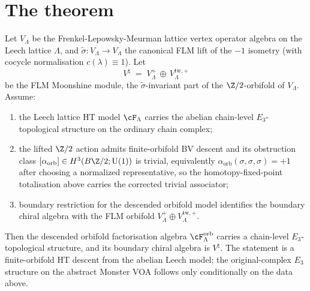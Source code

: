 \section{The theorem}
\label{sec:monster-chain-level-e3-top-statement}

\begin{theorem}
\label{thm:monster-chain-level-e3-top}
Let $V_\Lambda$ be the Frenkel-Lepowsky-Meurman lattice vertex
operator algebra on the Leech lattice $\Lambda$, and
$\widetilde{\sigma}\colon V_\Lambda \to V_\Lambda$ the canonical FLM
lift of the $-1$ isometry (with cocycle normalisation
$c(\lambda) \equiv 1$). Let
\[
 V^\natural
 \;=\; V_\Lambda^+
 \,\oplus\, V_\Lambda^{\mathrm{tw},+}
\]
be the FLM Moonshine module, the $\widetilde{\sigma}$-invariant part
of the $\Z/2$-orbifold of $V_\Lambda$. Assume:
\begin{enumerate}[label=\textup{(\roman*)}]
\item the Leech lattice HT model $\cF_\Lambda$ carries the abelian
chain-level $E_3$-topological structure on the ordinary chain complex;
\item the lifted $\Z/2$ action admits finite-orbifold BV descent and
its obstruction class
$[\alpha_{\mathrm{orb}}]\in H^3(B\Z/2;\mathrm{U}(1))$ is trivial,
equivalently
$\alpha_{\mathrm{orb}}(\sigma,\sigma,\sigma)=+1$ after choosing a
normalized representative, so the homotopy-fixed-point totalisation
above carries the corrected trivial associator;
\item boundary restriction for the descended orbifold model identifies
the boundary chiral algebra with the FLM orbifold
$V_\Lambda^+\oplus V_\Lambda^{\mathrm{tw},+}$.
\end{enumerate}
Then the descended orbifold factorisation algebra
$\cF_\Lambda^{\mathrm{orb}}$ carries a chain-level $E_3$-topological
structure, and its boundary chiral algebra is $V^\natural$. The
statement is a finite-orbifold HT descent from the abelian Leech model;
the original-complex $E_3$ structure on the abstract Monster VOA
follows only conditionally on the data above.
\end{theorem}

